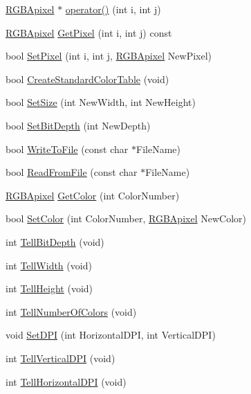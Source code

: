 \begin{CompactItemize}
\item 
\hyperlink{struct_r_g_b_apixel}{RGBApixel} $\ast$ \hyperlink{classcpp_b_m_p_02a494f74cfc7d319e6ea9c1ab70c672}{operator()} (int i, int j)
\item 
\hyperlink{struct_r_g_b_apixel}{RGBApixel} \hyperlink{classcpp_b_m_p_230d6694feababb803a9b4cdd4885d4d}{GetPixel} (int i, int j) const 
\item 
bool \hyperlink{classcpp_b_m_p_3d02d63c0abf0c87bb3698b26ac78dae}{SetPixel} (int i, int j, \hyperlink{struct_r_g_b_apixel}{RGBApixel} NewPixel)
\item 
bool \hyperlink{classcpp_b_m_p_2784c5b22510793c4f33bb9f566de4a7}{CreateStandardColorTable} (void)
\item 
bool \hyperlink{classcpp_b_m_p_9a6372827cbeb056c76f418bf764455d}{SetSize} (int NewWidth, int NewHeight)
\item 
bool \hyperlink{classcpp_b_m_p_4929652b47f073d3519b07fc05ed9eab}{SetBitDepth} (int NewDepth)
\item 
bool \hyperlink{classcpp_b_m_p_bee4a161c6d3ad3d627b70b62735259d}{WriteToFile} (const char $\ast$FileName)
\item 
bool \hyperlink{classcpp_b_m_p_b6b3269e3dc09cc5a9650578d5f5aa45}{ReadFromFile} (const char $\ast$FileName)
\item 
\hyperlink{struct_r_g_b_apixel}{RGBApixel} \hyperlink{classcpp_b_m_p_fa347d92080c6aa4870eb4b076d1aeba}{GetColor} (int ColorNumber)
\item 
bool \hyperlink{classcpp_b_m_p_954ee0b08e8b0e9455fe5c4a9e7a7181}{SetColor} (int ColorNumber, \hyperlink{struct_r_g_b_apixel}{RGBApixel} NewColor)
\item 
int \hyperlink{classcpp_b_m_p_95cf17f997cf74cbfaf889572bf7d751}{TellBitDepth} (void)
\item 
int \hyperlink{classcpp_b_m_p_539ec9582a0ebd2853d168eae6bfc68f}{TellWidth} (void)
\item 
int \hyperlink{classcpp_b_m_p_8dd563361efe9adc4bbe8ac88681811b}{TellHeight} (void)
\item 
int \hyperlink{classcpp_b_m_p_aef114087d702d456ef994bb64535e6e}{TellNumberOfColors} (void)
\item 
void \hyperlink{classcpp_b_m_p_96505f0e4666bd19d0c60e8eed948158}{SetDPI} (int HorizontalDPI, int VerticalDPI)
\item 
int \hyperlink{classcpp_b_m_p_809856c4aae1027fa37a7c3dd94d06c9}{TellVerticalDPI} (void)
\item 
int \hyperlink{classcpp_b_m_p_b0d8279d21b6890e9f7664bc46d4ff64}{TellHorizontalDPI} (void)

\end{CompactItemize}
